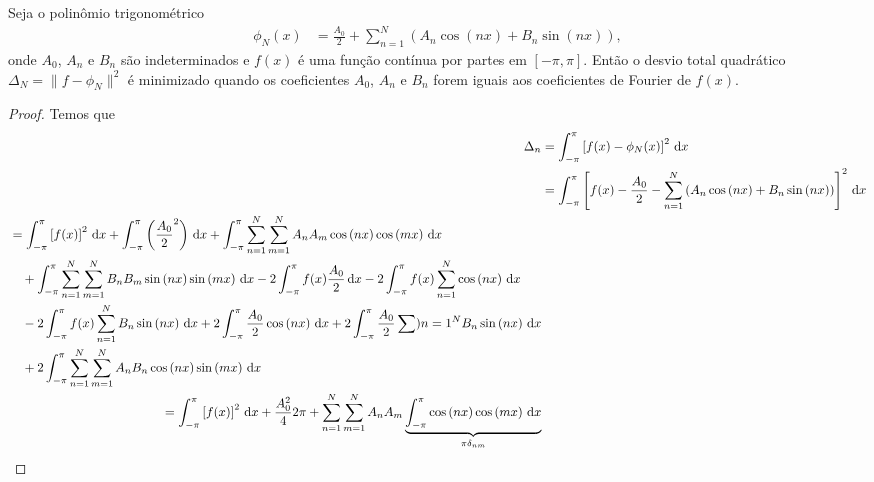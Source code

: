 \begin{teo} \label{teo:min_desvio_total_quad}
    Seja o polin\^{o}mio trigonom\'{e}trico
    \begin{align*}
        \phi_N(x) &= \frac{A_0}{2} + \sum_{n = 1}^N \left( A_n \cos\left( n x \right) + B_n \sin\left( n x \right) \right),
    \end{align*}
    onde $A_0$, $A_n$ e $B_n$ s\~{a}o indeterminados e $f(x)$ \'{e} uma fun\c{c}\~{a}o cont\'{i}nua por partes em $[-\pi, \pi]$. Ent\~{a}o o desvio total quadr\'{a}tico $\Delta_N = \| f - \phi_N \|^2$ \'{e} minimizado quando os coeficientes $A_0$, $A_n$ e $B_n$ forem iguais aos coeficientes de Fourier de $f(x)$.
\end{teo}
\begin{proof}
    Temos que
    \begin{align*}
        \Delta_n &= \int_{-\pi}^\pi \left[ f(x) - \phi_N(x) \right]^2 \id{x} \\
        &= \int_{-\pi}^\pi \left[ f(x) - \frac{A_0}{2} - \sum_{n = 1}^N \left( A_n \cos\left( n x \right) + B_n \sin\left( n x \right) \right) \right]^2 \id{x} \\
        \begin{split}
            &= \int_{-\pi}^\pi \left[ f(x) \right]^2 \id{x} + \int_{-\pi}^\pi \left( \frac{A_0}{2}^2 \right) \id{x} + \int_{-\pi}^\pi \sum_{n = 1}^N \sum_{m = 1}^N A_n A_m \cos\left( n x \right) \cos\left( m x \right) \id{x} \\
            &\quad {}+ \int_{-\pi}^\pi \sum_{n = 1}^N \sum_{m = 1}^N B_n B_m \sin\left( n x \right) \sin\left( m x \right) \id{x} - 2 \int_{-\pi}^\pi f(x) \frac{A_0}{2} \id{x} - 2 \int_{-\pi}^\pi f(x) \sum_{n = 1}^N \cos\left( n x \right) \id{x} \\
            &\quad {}- 2 \int_{-\pi}^\pi f(x) \sum_{n = 1}^N B_n \sin\left( n x \right) \id{x} + 2 \int_{-\pi}^\pi \frac{A_0}{2} \cos\left( n x \right) \id{x} + 2 \int_{-\pi}^\pi \frac{A_0}{2} \sum){n = 1}^N B_n \sin\left( n x \right) \id{x} \\
            &\quad {}+ 2 \int_{-\pi}^\pi \sum_{n = 1}^N \sum_{m = 1}^N A_n B_n \cos\left( n x \right) \sin\left( m x \right) \id{x}
        \end{split} \\
        \begin{split}
            &= \int_{-\pi}^\pi \left[ f(x) \right]^2 \id{x} + \frac{A_0^2}{4} 2 \pi + \sum_{n = 1}^N \sum_{m = 1}^N A_n A_m \underbrace{\int_{-\pi}^\pi \cos\left( n x \right) \cos\left( m x \right) \id{x}}_{\pi \delta_{nm}} \\

\end{split}
\end{align*}
\end{proof}
